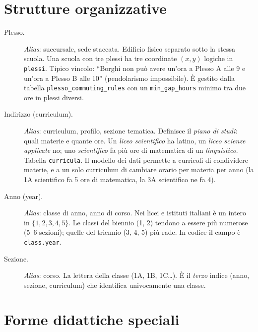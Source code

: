 \section{Strutture organizzative}

\begin{description}
\item[Plesso.]
  \emph{Alias}: succursale, sede staccata. Edificio fisico
  separato sotto la stessa scuola. Una scuola con tre plessi
  ha tre coordinate $(x,y)$ logiche in
  \texttt{plessi}. Tipico vincolo: ``Borghi non pu\`o avere
  un'ora a Plesso A alle 9 e un'ora a Plesso B alle 10''
  (pendolarismo impossibile). \`E gestito dalla tabella
  \texttt{plesso\_commuting\_rules} con un \texttt{min\_gap\_hours}
  minimo tra due ore in plessi diversi.

\item[Indirizzo (curriculum).]
  \emph{Alias}: curriculum, profilo, sezione tematica.
  Definisce il \emph{piano di studi}: quali materie e quante
  ore. Un \emph{liceo scientifico} ha latino, un \emph{liceo
  scienze applicate} no; uno \emph{scientifico} fa pi\`u ore
  di matematica di un \emph{linguistico}. Tabella
  \texttt{curricula}. Il modello dei dati permette a
  curricoli di condividere materie, e a un solo curriculum
  di cambiare orario per materia per anno (la 1A scientifico
  fa 5 ore di matematica, la 3A scientifico ne fa 4).

\item[Anno (year).]
  \emph{Alias}: classe di anno, anno di corso. Nei licei e
  istituti italiani \`e un intero in $\{1,2,3,4,5\}$. Le
  classi del biennio (1, 2) tendono a essere pi\`u numerose
  (5--6 sezioni); quelle del triennio (3, 4, 5) pi\`u rade.
  In codice il campo \`e \texttt{class.year}.

\item[Sezione.]
  \emph{Alias}: corso. La lettera della classe (1A, 1B,
  1C\ldots). \`E il \emph{terzo} indice (anno, sezione,
  curriculum) che identifica univocamente una classe.
\end{description}

\section{Forme didattiche speciali}

